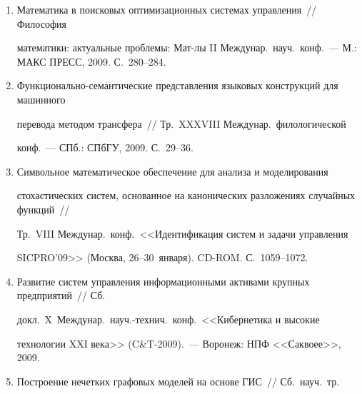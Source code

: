 \begin{enumerate}[1.]
\item {}


Математика в поисковых оптимизационных системах управления~// Философия 


математики: актуальные проблемы: Мат-лы II Междунар.\ науч.\ конф.~--- М.: МАКС ПРЕСС, 2009. С.~280--284.





\item {}


Функционально-семантические представления языковых конструкций для машинного 


перевода методом трансфера~// Тр.\ XXXVIII Междунар.\ филологической 


конф.~--- СПб.: СПбГУ, 2009. С.~29--36.





\item {}


Символьное математическое обеспечение для анализа и моделирования 


стохастических систем, основанное на канонических разложениях случайных функций~// 


Тр.\ VIII Междунар.\ конф.\ <<Идентификация систем и задачи управления 


SICPRO'09>> (Москва, 26--30~января). CD-ROM. С.~1059--1072.





\item {}


Развитие систем управления информационными активами крупных предприятий~// Сб.\ 


докл.\ X~Междунар.\ науч.-технич.\ конф.\ <<Кибернетика и высокие 


технологии XXI века>> (C\&T-2009).~--- Воронеж: НПФ <<Саквоее>>, 2009.





\item {}


Построение нечетких графовых моделей на основе ГИС~// Сб.\ науч.\ тр.\ 



\end{enumerate}

